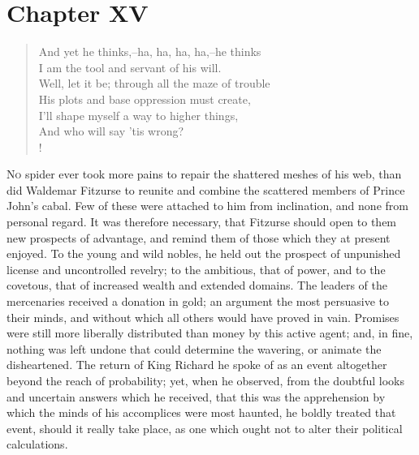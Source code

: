 \chapter{Chapter XV}

\begin{verse}
And yet he thinks,--ha, ha, ha, ha,--he thinks\\
I am the tool and servant of his will.\\
Well, let it be; through all the maze of trouble\\
His plots and base oppression must create,\\
I'll shape myself a way to higher things,\\
And who will say 'tis wrong?\\!
\end{verse}

\lettrine{N}{o} spider ever took more pains to repair the shattered
meshes of his
web, than did Waldemar Fitzurse to reunite and combine the scattered
members of Prince John's cabal. Few of these were attached to him from
inclination, and none from personal regard. It was therefore necessary,
that Fitzurse should open to them new prospects of advantage, and remind
them of those which they at present enjoyed. To the young and wild
nobles, he held out the prospect of unpunished license and uncontrolled
revelry; to the ambitious, that of power, and to the covetous, that of
increased wealth and extended domains. The leaders of the mercenaries
received a donation in gold; an argument the most persuasive to their
minds, and without which all others would have proved in vain. Promises
were still more liberally distributed than money by this active agent;
and, in fine, nothing was left undone that could determine the wavering,
or animate the disheartened. The return of King Richard he spoke of as
an event altogether beyond the reach of probability; yet, when he
observed, from the doubtful looks and uncertain answers which he
received, that this was the apprehension by which the minds of his
accomplices were most haunted, he boldly treated that event, should it
really take place, as one which ought not to alter their political
calculations.

